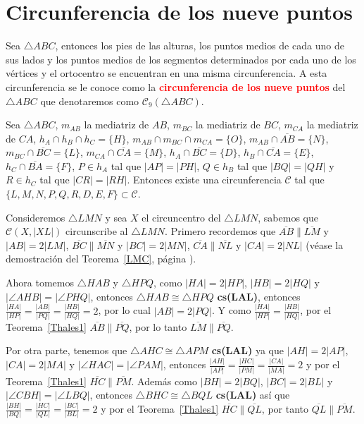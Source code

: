 \section{Circunferencia de los nueve puntos}
\begin{teo} Sea $\triangle ABC$, entonces los pies de las alturas, los puntos medios de cada uno de sus lados y los puntos medios de los segmentos determinados por cada uno de los vértices y el ortocentro se encuentran en una misma circunferencia. A esta circunferencia se le conoce como la \textcolor{red}{\bf circunferencia de los nueve puntos} del $\triangle ABC$ que denotaremos como $\mathcal{C}_{9}(\triangle ABC)$.
\end{teo}
\begin{dem}
Sea $\triangle ABC$, $m_{AB}$ la mediatriz de $AB$, $m_{BC}$ la mediatriz de $BC$, $m_{CA}$ la mediatriz de $CA$, $h_{A}\cap h_{B}\cap h_{C}=\{H\}$, $m_{AB}\cap m_{BC}\cap m_{CA}=\{O\}$, $m_{AB}\cap\overline{AB}=\{N\}$, $m_{BC}\cap\overline{BC}=\{L\}$, $m_{CA}\cap\overline{CA}=\{M\}$, $h_{A}\cap\overline{BC}=\{D\}$, $h_{B}\cap\overline{CA}=\{E\}$, $h_{C}\cap\overline{BA}=\{F\}$, $P\in h_{A}$ tal que $|AP|=|PH|$, $Q\in h_{B}$ tal  que $|BQ|=|QH|$ y $R\in h_{C}$ tal que $|CR|=|RH|$. Entonces existe una circunferencia $\mathcal{C}$ tal que $\{L,M,N,P,Q,R,D,E,F\}\subset\mathcal{C}$. 

Consideremos $\triangle LMN$ y sea $X$ el circuncentro del $\triangle LMN$, sabemos que $\mathcal{C}(X,|XL|)$ circunscribe al $\triangle LMN$. Primero recordemos que $\overline{AB}\parallel\overline{LM}$ y $|AB|=2|LM|$, $\overline{BC}\parallel\overline{MN}$ y $|BC|=2|MN|$, $\overline{CA}\parallel\overline{NL}$ y $|CA|=2|NL|$ (véase la demostración del Teorema~\ref{LMC}, página \pageref{LMC}).

Ahora tomemos $\triangle HAB$ y $\triangle HPQ$, como $|HA|=2|HP|$, $|HB|=2|HQ|$  y $|\angle AHB|=|\angle PHQ|$, entonces $\triangle HAB\cong\triangle HPQ$ \textbf{cs(LAL)}, entonces $\frac{|HA|}{|HP|}=\frac{|AB|}{|PQ|}=\frac{|HB|}{|HQ|}=2$, por lo cual $|AB|=2|PQ|$. Y como  $\frac{|HA|}{|HP|}=\frac{|HB|}{|HQ|}$, por el Teorema~\ref{Thales1} $\overline{AB}\parallel\overline{PQ}$, por lo tanto $\overline{LM}\parallel\overline{PQ}$.

Por otra parte, tenemos que $\triangle AHC\cong\triangle APM$ \textbf{cs(LAL)} ya que $|AH|=2|AP|$, $|CA|=2|MA|$ y $|\angle HAC|=|\angle PAM|$, entonces $\frac{|AH|}{|AP|}=\frac{|HC|}{|PM|}=\frac{|CA|}{|MA|}=2$ y por el Teorema~\ref{Thales1} $\overline{HC}\parallel\overline{PM}$. Además como $|BH|=2|BQ|$, $|BC|=2|BL|$ y $|\angle CBH|=|\angle LBQ|$, entonces $\triangle BHC\cong\triangle BQL$ \textbf{cs(LAL)} así que $\frac{|BH|}{|BQ|}=\frac{|HC|}{|QL|}=\frac{|BC|}{|BL|}=2$ y por el Teorema~\ref{Thales1} $\overline{HC}\parallel\overline{QL}$, por tanto $\overline{QL}\parallel\overline{PM}$.


\end{dem}
